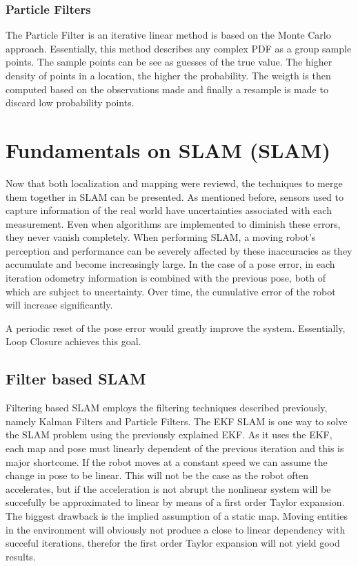 \subsubsection{Particle Filters}

The Particle Filter is an iterative linear method is based on the Monte Carlo approach. Essentially, this method describes any complex \acs*{PDF} as a group sample points. The sample points can be see as guesses of the true value. The higher density of points in a location, the higher the probability. The weigth is then computed based on the observations made and finally a resample is made to discard low probability points.


\section{Fundamentals on \acl*{SLAM} (\acs*{SLAM})}

Now that both localization and mapping were reviewd, the techniques to merge them together in \acs*{SLAM} can be presented. As mentioned before, sensors used to capture information of the real world have uncertainties associated with each measurement. Even when algorithms are implemented to diminish these errors, they never vanish completely. When performing \acs*{SLAM}, a moving robot's perception and performance can be severely affected by these inaccuracies as they accumulate and become increasingly large. In the case of a pose error, in each iteration odometry information is combined with the previous pose, both of which are subject to uncertainty. Over time, the cumulative error of the robot will increase significantly. 

A periodic reset of the pose error would greatly improve the system. Essentially, Loop Closure achieves this goal.

\subsection{Filter based \acs*{SLAM}}

Filtering based \acs*{SLAM} employs the filtering techniques described previously, namely Kalman Filters and Particle Filters. The \acs*{EKF} \acs*{SLAM} is one way to solve the \acs*{SLAM} problem using the previously explained \acl*{EKF}. As it uses the \acs*{EKF}, each map and pose must linearly dependent of the previous iteration and this is major shortcome. If the robot moves at a constant speed we can assume the change in pose to be linear. This will not be the case as the robot often accelerates, but if the acceleration is not abrupt the nonlinear system will be succefully be approximated to linear by means of a first order Taylor expansion. The biggest drawback is the implied assumption of a static map. Moving entities in the environment will obviously not produce a close to linear dependency with succeful iterations, therefor the first order Taylor expansion will not yield good results. 


